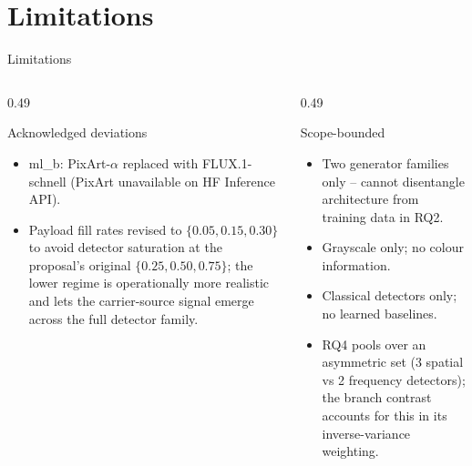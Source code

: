 \documentclass[aspectratio=169,11pt]{beamer}
\begin{document}
\section{Limitations}
\begin{frame}{Limitations}
\small
\begin{columns}[T]
\begin{column}{0.49\textwidth}
\begin{block}{Acknowledged deviations}
\begin{itemize}
\item ml\_b: PixArt-$\alpha$ replaced with FLUX.1-schnell (PixArt unavailable on HF Inference API).
\item Payload fill rates revised to $\{0.05, 0.15, 0.30\}$ to avoid detector saturation at the proposal's original $\{0.25, 0.50, 0.75\}$; the lower regime is operationally more realistic and lets the carrier-source signal emerge across the full detector family.
\end{itemize}
\end{block}
\end{column}
\begin{column}{0.49\textwidth}
\begin{block}{Scope-bounded}
\begin{itemize}
\item Two generator families only -- cannot disentangle architecture from training data in RQ2.
\item Grayscale only; no colour information.
\item Classical detectors only; no learned baselines.
\item RQ4 pools over an asymmetric set (3 spatial vs 2 frequency detectors); the branch contrast accounts for this in its inverse-variance weighting.
\end{itemize}
\end{block}
\end{column}
\end{columns}
\end{frame}

\end{document}

